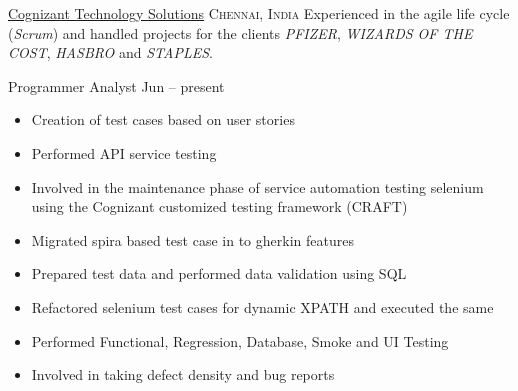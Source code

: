 
\headedsection  %
  {\href{https://www.cognizant.com}{Cognizant Technology Solutions}}
  {\textsc{Chennai, India}} 
  {\newline{}Experienced in the agile life cycle (\emph{Scrum}) and handled projects for the clients  \emph{PFIZER}, \emph{WIZARDS OF THE COST}, \emph{HASBRO} and \emph{STAPLES}.
} 
  {%
  \headedsubsection
    {Programmer Analyst}
    {Jun  -- present}
    {\begin{itemize}
        \item Creation of test cases based on user stories 
        \item Performed API service testing
        \item Involved in the maintenance phase of service automation testing selenium using  the Cognizant customized testing framework (CRAFT)
        \item Migrated spira based test case in to gherkin features
        \item Prepared test data and performed data validation using SQL
        \item Refactored selenium test cases for dynamic XPATH and executed the same
        \item Performed Functional, Regression, Database, Smoke and UI Testing
        \item Involved in taking defect density and bug reports
    \end{itemize}
    }
}
